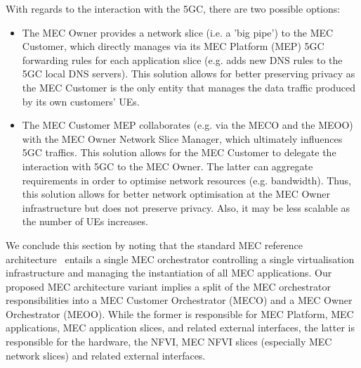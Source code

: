 With regards to the interaction with the 5GC, there are two possible options:
%
\renewcommand\labelitemi{$\bullet$}
\begin{itemize}[noitemsep,topsep=2pt]
    \item The MEC Owner provides a network slice (i.e. a 'big pipe') to the MEC Customer, which directly manages via its MEC Platform (MEP) 5GC forwarding rules for each application slice (e.g. adds new DNS rules to the 5GC local DNS servers). This solution allows for better preserving privacy as the MEC Customer is the only entity that manages the data traffic produced by its own customers' UEs.
    \item The MEC Customer MEP collaborates (e.g. via the MECO and the MEOO) with the MEC Owner Network Slice Manager, which ultimately influences 5GC traffics. This solution allows for the MEC Customer to delegate the interaction with 5GC to the MEC Owner. The latter can aggregate requirements in order to optimise network resources (e.g. bandwidth). Thus, this solution allows for better network optimisation at the MEC Owner infrastructure but does not preserve privacy. Also, it may be less scalable as the number of UEs increases.
\end{itemize}
%
We conclude this section by noting that the standard MEC reference architecture~\cite{MEC003} entails a single MEC orchestrator controlling a single virtualisation infrastructure and managing the instantiation of all MEC applications. Our proposed MEC architecture variant implies a split of the MEC orchestrator responsibilities into a MEC Customer Orchestrator (MECO) and a MEC Owner Orchestrator (MEOO). While the former is responsible for MEC Platform, MEC applications, MEC application slices, and related external interfaces, the latter is responsible for the hardware, the NFVI, MEC NFVI slices (especially MEC network slices) and related external interfaces. 

